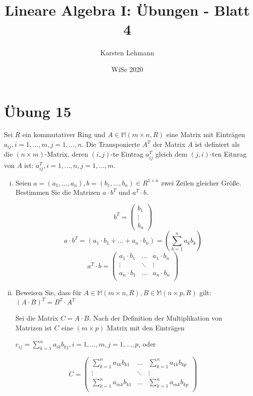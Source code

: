 \documentclass{article}
\author{Karsten Lehmann}
\date{WiSe 2020}
\title{Lineare Algebra I: Übungen - Blatt 4}
\begin{document}
\section*{Übung 15}

Sei $R$ ein kommutativer Ring und $A \in \mathbb{M}(m \times n, R)$ eine Matrix mit Einträgen
$a_{ij}, i  = 1, \ldots, m, j = 1, \ldots, n$.
Die Transponierte $A^T$ der Matrix $A$ ist definiert als die $(n \times m)$-Matrix, deren $(i, j)$-te
Eintrag $a_{ij}^T$ gleich dem $(j,i)$-ten Eitnrag von $A$ ist: $a_{ij}^T, i = 1, \ldots, n, j = 1, \ldots, m$.

\begin{enumerate}[(i)]
\item
  Seien $a = (a_1, \ldots, a_n), b = (b_1, \ldots, b_n) \in R^{1\times n}$ zwei Zeilen gleicher Größe. Bestimmen Sie die Matrizen
  $a \cdot b^T$ und $a^T \cdot b$.

  \[
    b^T = \begin{pmatrix}b_1 \\ \vdots \\ b_n\end{pmatrix}
  \]
  \[
    a \cdot b^T = (a_1 \cdot b_1 + \ldots + a_n \cdot b_n) = \left( \sum\limits_{k=1}^n a_kb_k \right)
  \]
  \[
    a^T \cdot b =
    \begin{pmatrix}
      a_1 \cdot b_1 & \ldots & a_1 \cdot b_n \\
      \vdots        & \ddots & \vdots \\
      a_n \cdot b_1 & \ldots & a_n \cdot b_n \\
    \end{pmatrix}
  \]

\item
  Beweisen Sie, dass für $A \in \mathbb{M}(m \times n, R), B \in \mathbb{M}(n \times p,R)$ gilt: $(A \cdot B)^T = B^T \cdot A^T$
  
  Sei die Matrix $C = A \cdot B$. Nach der Definition der Multiplikation von Matrizen ist $C$  eine $(m \times p)$ Matrix
  mit den Einträgen

  $c_{ij} = \sum\limits_{k=1}^n a_{ik}b_{kj}, i = 1, \ldots, m, j = 1, \ldots, p$, oder

  \[
    C = \begin{pmatrix}
      \sum\limits_{k=1}^n a_{1k}b_{k1} & \ldots & \sum\limits_{k=1}^n a_{1k}b_{kp} \\
      \vdots                         & \ddots & \vdots \\
      \sum\limits_{k=1}^n a_{mk}b_{k1} & \ldots & \sum\limits_{k=1}^n a_{mk}b_{kp} \\
    \end{pmatrix}
  \]


\end{enumerate}
\end{document}
